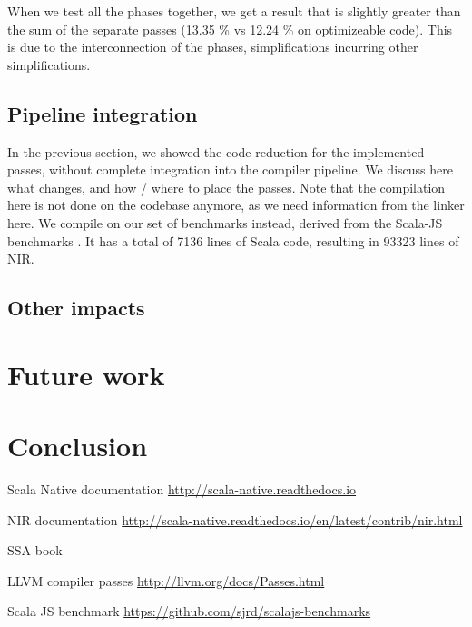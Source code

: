 \documentclass[11pt,a4paper]{article}
\newcommand{\perf}[1]{#1 \%}
\begin{document}
When we test all the phases together, we get a result that is slightly greater than the sum of the separate passes (\perf{13.35} vs \perf{12.24} on optimizeable code). This is due to the interconnection of the phases, simplifications incurring other simplifications.


\subsection{Pipeline integration}

In the previous section, we showed the code reduction for the implemented passes, without complete integration into the compiler pipeline. We discuss here what changes, and how / where to place the passes. Note that the compilation here is not done on the codebase anymore, as we need information from the linker here. We compile on our set of benchmarks instead, derived from the Scala-JS benchmarks \cite{scalajsbench}. It has a total of 7136 lines of Scala code, resulting in 93323 lines of NIR.

\subsection{Other impacts}





\section{Future work}


\section{Conclusion}


\begin{thebibliography}{9}

    Scala Native documentation \newline \url{http://scala-native.readthedocs.io}

	 NIR documentation \newline \url{http://scala-native.readthedocs.io/en/latest/contrib/nir.html}
	
	 SSA book
	
	 LLVM compiler passes \newline \url{http://llvm.org/docs/Passes.html}

	 Scala JS benchmark \newline \url{https://github.com/sjrd/scalajs-benchmarks}

\end{thebibliography}
\end{document}
